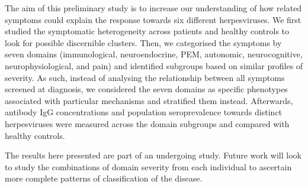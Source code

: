 \bsni
The aim of this preliminary study is to increase our understanding of how related symptoms could explain the response towards six different herpesviruses.
We first studied the symptomatic heterogeneity across \cfs patients and healthy controls to look for possible discernible clusters.
Then, we categorised the symptoms by seven domains (immunological, neuroendocrine, PEM, autonomic, neurocognitive, neurophysiological, and pain) and identified subgroups based on similar profiles of severity.
As such, instead of analysing the relationship between all symptoms screened at diagnosis, we considered the seven domains as specific phenotypes associated with particular mechanisms and stratified them instead.
Afterwards, antibody IgG concentrations and population seroprevalence towards distinct herpesviruses were measured across the domain subgroups and compared with healthy controls.

The results here presented are part of an undergoing study.
Future work will look to study the combinations of domain severity from each individual to ascertain more complete patterns of classification of the disease.






